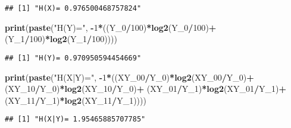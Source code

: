 \documentclass[]{article}
\newenvironment{Shaded}{\begin{snugshade}}{\end{snugshade}}
\newcommand{\KeywordTok}[1]{\textcolor[rgb]{0.13,0.29,0.53}{\textbf{#1}}}
\newcommand{\DecValTok}[1]{\textcolor[rgb]{0.00,0.00,0.81}{#1}}
\newcommand{\StringTok}[1]{\textcolor[rgb]{0.31,0.60,0.02}{#1}}
\newcommand{\OperatorTok}[1]{\textcolor[rgb]{0.81,0.36,0.00}{\textbf{#1}}}
\newcommand{\NormalTok}[1]{#1}
\begin{document}
\begin{verbatim}
## [1] "H(X)= 0.976500468757824"
\end{verbatim}

\begin{Shaded}
\begin{Highlighting}[]
\KeywordTok{print}\NormalTok{(}\KeywordTok{paste}\NormalTok{(}\StringTok{"H(Y)="}\NormalTok{, }\OperatorTok{-}\DecValTok{1}\OperatorTok{*}\NormalTok{((Y_}\DecValTok{0}\OperatorTok{/}\DecValTok{100}\NormalTok{)}\OperatorTok{*}\KeywordTok{log2}\NormalTok{(Y_}\DecValTok{0}\OperatorTok{/}\DecValTok{100}\NormalTok{)}\OperatorTok{+}\NormalTok{(Y_}\DecValTok{1}\OperatorTok{/}\DecValTok{100}\NormalTok{)}\OperatorTok{*}\KeywordTok{log2}\NormalTok{(Y_}\DecValTok{1}\OperatorTok{/}\DecValTok{100}\NormalTok{))))}
\end{Highlighting}
\end{Shaded}

\begin{verbatim}
## [1] "H(Y)= 0.970950594454669"
\end{verbatim}

\begin{Shaded}
\begin{Highlighting}[]
\KeywordTok{print}\NormalTok{(}\KeywordTok{paste}\NormalTok{(}\StringTok{"H(X|Y)="}\NormalTok{, }
            \OperatorTok{-}\DecValTok{1}\OperatorTok{*}\NormalTok{((XY_}\DecValTok{00}\OperatorTok{/}\NormalTok{Y_}\DecValTok{0}\NormalTok{)}\OperatorTok{*}\KeywordTok{log2}\NormalTok{(XY_}\DecValTok{00}\OperatorTok{/}\NormalTok{Y_}\DecValTok{0}\NormalTok{)}\OperatorTok{+}
\StringTok{            }\NormalTok{(XY_}\DecValTok{10}\OperatorTok{/}\NormalTok{Y_}\DecValTok{0}\NormalTok{)}\OperatorTok{*}\KeywordTok{log2}\NormalTok{(XY_}\DecValTok{10}\OperatorTok{/}\NormalTok{Y_}\DecValTok{0}\NormalTok{)}\OperatorTok{+}
\StringTok{            }\NormalTok{(XY_}\DecValTok{01}\OperatorTok{/}\NormalTok{Y_}\DecValTok{1}\NormalTok{)}\OperatorTok{*}\KeywordTok{log2}\NormalTok{(XY_}\DecValTok{01}\OperatorTok{/}\NormalTok{Y_}\DecValTok{1}\NormalTok{)}\OperatorTok{+}
\StringTok{            }\NormalTok{(XY_}\DecValTok{11}\OperatorTok{/}\NormalTok{Y_}\DecValTok{1}\NormalTok{)}\OperatorTok{*}\KeywordTok{log2}\NormalTok{(XY_}\DecValTok{11}\OperatorTok{/}\NormalTok{Y_}\DecValTok{1}\NormalTok{))))}
\end{Highlighting}
\end{Shaded}

\begin{verbatim}
## [1] "H(X|Y)= 1.95465885707785"
\end{verbatim}
\end{document}
